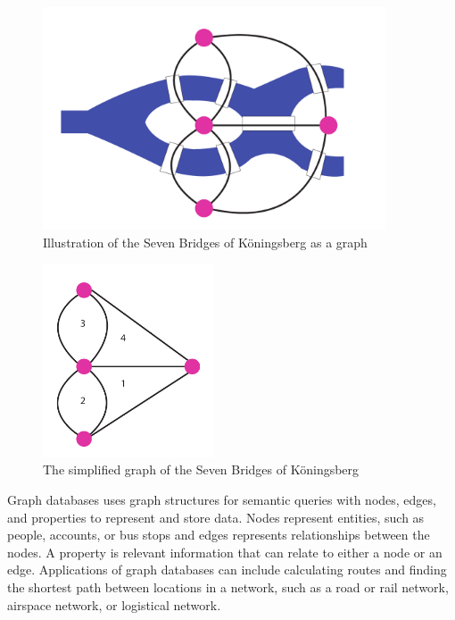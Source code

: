 \begin{figure}[H]
  \centering
  \includegraphics[width=4in]{assets/7bridges.pdf}
  \caption{Illustration of the Seven Bridges of Köningsberg as a graph}
  \label{fig:7bridgesIllustration}
\end{figure}

\begin{figure}[H]
  \centering
  \includegraphics[width=2in]{assets/7bridges2.pdf}
  \caption{The simplified graph of the Seven Bridges of Köningsberg} 
  \label{fig:7bridgesSimplification}
\end{figure}

Graph databases uses graph structures for semantic queries with nodes, edges, and properties to represent and store data.
Nodes represent entities, such as people, accounts, or bus stops and edges represents relationships between the nodes. A property is relevant information that can relate to either a node or an edge.
Applications of graph databases can include calculating routes and finding the shortest path between locations in a network, such as a road or rail network, airspace network, or logistical network\citep[p.102]{robinson13}. 

